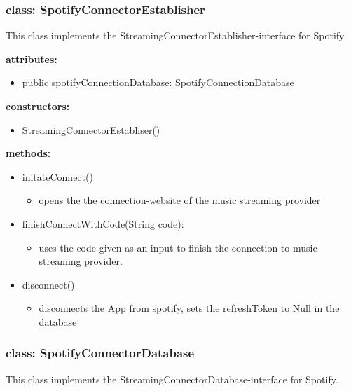 \documentclass[oneside, ngerman]{sdqtechreport}
\begin{document}
\subsubsection{class: SpotifyConnectorEstablisher}
This class implements the StreamingConnectorEstablisher-interface for Spotify.

\textbf{attributes:}
\begin{itemize}
    \item public spotifyConnectionDatabase: SpotifyConnectionDatabase
\end{itemize}
\textbf{constructors:}
\begin{itemize}
    \item StreamingConnectorEstabliser()
\end{itemize}
\textbf{methods:}
\begin{itemize}
    \item initateConnect()
    \begin{itemize}
        \item opens the the connection-website of the music streaming provider
    \end{itemize}
    \item finishConnectWithCode(String code):
    \begin{itemize}
        \item uses the code given as an input to finish the connection to music streaming provider.
    \end{itemize}
    \item disconnect()
    \begin{itemize}
        \item disconnects the App from spotify, sets the refreshToken to Null in the database
    \end{itemize}
\end{itemize}

\subsubsection{class: SpotifyConnectorDatabase}
This class implements the StreamingConnectorDatabase-interface for Spotify.
\end{document}
